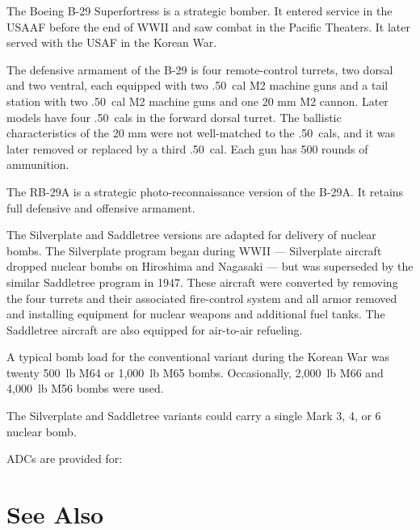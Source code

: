 
The Boeing B-29 Superfortress is a strategic bomber. It entered service in the USAAF before the end of WWII and saw combat in the Pacific Theaters. It later served with the USAF in the Korean War.

The defensive armament of the B-29 is four remote-control turrets, two dorsal and two ventral, each equipped with two .50~cal M2 machine guns and a tail station with two .50~cal M2 machine guns and one 20 mm M2 cannon. Later models have four .50~cals in the forward dorsal turret. The ballistic characteristics of the 20 mm were not well-matched to the .50~cals, and it was later removed or replaced by a third .50~cal. Each gun has 500 rounds of ammunition.

The RB-29A is a strategic photo-reconnaissance version of the B-29A. It retains full defensive and offensive armament.

The Silverplate and Saddletree versions are adapted for delivery of nuclear bombs.  The Silverplate program began during WWII --- Silverplate aircraft dropped nuclear bombs on Hiroshima and Nagasaki --- but was superseded by the similar Saddletree program in 1947. These aircraft were converted by removing the four turrets and their associated fire-control system and all armor removed and installing equipment for nuclear weapons and additional fuel tanks. The Saddletree aircraft are also equipped for air-to-air refueling.

A typical bomb load for the conventional variant during the Korean War was twenty 500~lb M64 or 1,000~lb M65 bombs. Occasionally, 2,000~lb M66 and 4,000~lb M56 bombs were used.

The Silverplate and Saddletree variants could carry a single Mark 3, 4, or 6 nuclear bomb.

ADCs are provided for:
\begin{adclist}
\end{adclist}

\section{See Also}
\begin{typelist}
\end{typelist}